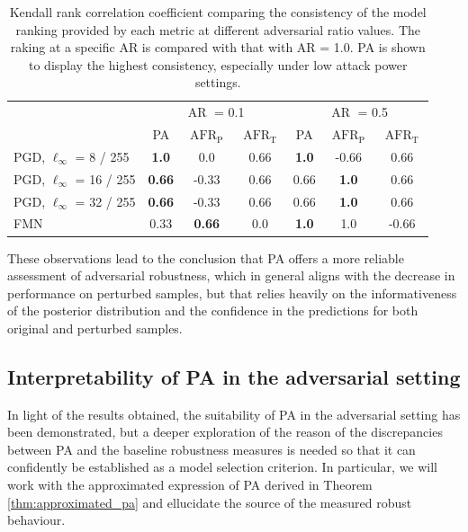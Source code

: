 \begin{table}[h]
    \centering
    \begin{tabular}{l|ccc|ccc}
    \multirow{2}{*}{} & \multicolumn{3}{c|}{$\operatorname{AR}$ = 0.1} & \multicolumn{3}{c}{$\operatorname{AR}$ = 0.5} \\
     & PA & $\operatorname{AFR}_{\text{P}}$ & $\operatorname{AFR}_{\text{T}}$ & PA & $\operatorname{AFR}_{\text{P}}$  & $\operatorname{AFR}_{\text{T}}$ \\
    \midrule
    PGD, $\ell_\infty$ = 8 / 255 & \textbf{1.0} & 0.0 & 0.66  & \textbf{1.0} & -0.66 & 0.66  \\  
    PGD, $\ell_\infty$ = 16 / 255 & \textbf{0.66} & -0.33 & 0.66 & 0.66  & \textbf{1.0} & 0.66 \\  
    PGD, $\ell_\infty$ = 32 / 255 & \textbf{0.66} & -0.33 & 0.66  & 0.66 & \textbf{1.0} & 0.66  \\  
    FMN & 0.33 & \textbf{0.66} & 0.0  & \textbf{1.0} & 1.0 & -0.66  \\  
    \bottomrule
    \end{tabular}
    \caption{
        Kendall rank correlation coefficient comparing the consistency of the model ranking
        provided by each metric at different adversarial ratio values. The raking at a specific AR is 
        compared with that with AR = 1.0. PA is shown to display the highest consistency, especially under
        low attack power settings.
    }
    \label{tab:kendall_comparison_table}
\end{table}

These observations lead to the conclusion that PA offers a more reliable
assessment of adversarial robustness, which in general aligns with the decrease
in performance on perturbed samples, but that relies heavily on the informativeness
of the posterior distribution and the confidence in the predictions for both
original and perturbed samples. \\

\subsection{Interpretability of PA in the adversarial setting}

In light of the results obtained, the suitability of
PA in the adversarial setting has been demonstrated, but a deeper exploration of the
reason of the discrepancies between PA and the baseline robustness measures is needed
so that it can confidently be established as a model selection criterion. In particular,
we will work with the approximated expression of PA derived in Theorem \ref{thm:approximated_pa} 
and ellucidate the source of the measured robust behaviour. \\

